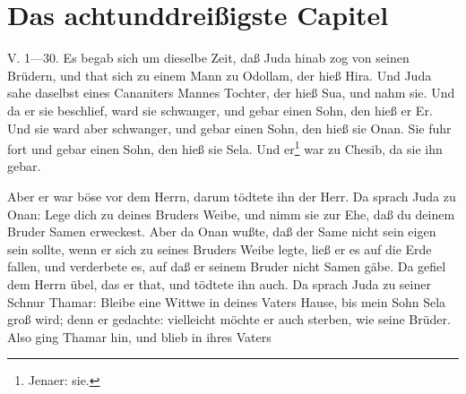\section{Das achtunddreißigste Capitel}

V. 1—30. Es begab sich um dieselbe Zeit, daß Juda hinab zog von seinen Brüdern, und that sich zu einem Mann zu Odollam, der hieß Hira. Und Juda sahe daselbst eines Cananiters Mannes Tochter, der hieß Sua, und nahm sie. Und da er sie beschlief, ward sie schwanger, und gebar einen Sohn, den hieß er Er. Und sie ward aber schwanger, und gebar einen Sohn, den hieß sie Onan. Sie fuhr fort und gebar einen Sohn, den hieß sie Sela. Und er\footnote{Jenaer: sie.} war zu Chesib, da sie ihn gebar.

Aber er war böse vor dem Herrn, darum tödtete ihn der Herr. Da sprach Juda zu Onan: Lege dich zu deines Bruders Weibe, und nimm sie zur Ehe, daß du deinem Bruder Samen erweckest. Aber da Onan wußte, daß der Same nicht sein eigen sein sollte, wenn er sich zu seines Bruders Weibe legte, ließ er es auf die Erde fallen, und verderbete es, auf daß er seinem Bruder nicht Samen gäbe. Da gefiel dem Herrn übel, das er that, und tödtete ihn auch. Da sprach Juda zu seiner Schnur Thamar: Bleibe eine Wittwe in deines Vaters Hause, bis mein Sohn Sela groß wird; denn er gedachte: vielleicht möchte er auch sterben, wie seine Brüder. Also ging Thamar hin, und blieb in ihres Vaters
